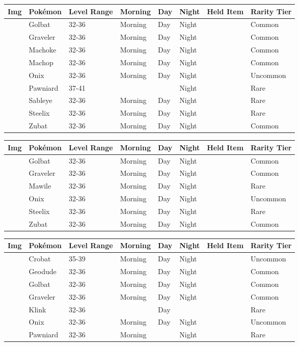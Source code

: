 \begin{longtable}{||l l l l l l l l||}%
\hline%
Img&Pokémon&Level Range&Morning&Day&Night&Held Item&Rarity Tier\\%
\hline%
\endhead%
\hline%
&Golbat&32{-}36&Morning&Day&Night&&Common\\%
\hline%
&Graveler&32{-}36&Morning&Day&Night&&Common\\%
\hline%
&Machoke&32{-}36&Morning&Day&Night&&Common\\%
\hline%
&Machop&32{-}36&Morning&Day&Night&&Common\\%
\hline%
&Onix&32{-}36&Morning&Day&Night&&Uncommon\\%
\hline%
&Pawniard&37{-}41&&&Night&&Rare\\%
\hline%
&Sableye&32{-}36&Morning&Day&Night&&Rare\\%
\hline%
&Steelix&32{-}36&Morning&Day&Night&&Rare\\%
\hline%
&Zubat&32{-}36&Morning&Day&Night&&Common\\%
\hline%
\end{longtable}%
\begin{longtable}{||l l l l l l l l||}%
\hline%
Img&Pokémon&Level Range&Morning&Day&Night&Held Item&Rarity Tier\\%
\hline%
\endhead%
\hline%
&Golbat&32{-}36&Morning&Day&Night&&Common\\%
\hline%
&Graveler&32{-}36&Morning&Day&Night&&Common\\%
\hline%
&Mawile&32{-}36&Morning&Day&Night&&Rare\\%
\hline%
&Onix&32{-}36&Morning&Day&Night&&Uncommon\\%
\hline%
&Steelix&32{-}36&Morning&Day&Night&&Rare\\%
\hline%
&Zubat&32{-}36&Morning&Day&Night&&Common\\%
\hline%
\end{longtable}%
\begin{longtable}{||l l l l l l l l||}%
\hline%
Img&Pokémon&Level Range&Morning&Day&Night&Held Item&Rarity Tier\\%
\hline%
\endhead%
\hline%
&Crobat&35{-}39&Morning&Day&Night&&Uncommon\\%
\hline%
&Geodude&32{-}36&Morning&Day&Night&&Common\\%
\hline%
&Golbat&32{-}36&Morning&Day&Night&&Common\\%
\hline%
&Graveler&32{-}36&Morning&Day&Night&&Common\\%
\hline%
&Klink&32{-}36&&Day&&&Rare\\%
\hline%
&Onix&32{-}36&Morning&Day&Night&&Uncommon\\%
\hline%
&Pawniard&32{-}36&Morning&&Night&&Rare\\%
\hline%
\end{longtable}%

